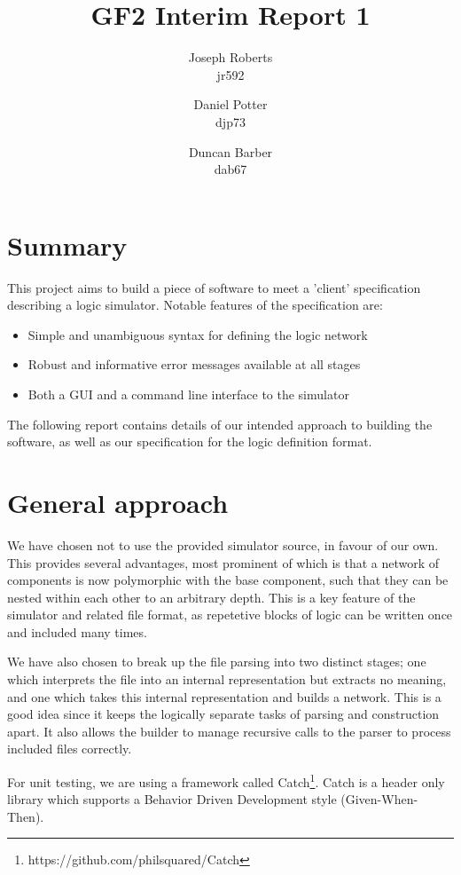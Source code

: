 \documentclass[a4paper]{article}
\author{Joseph Roberts \\
        \small{jr592}
        \and
        Daniel Potter\\
        \small{djp73}
        \and
        Duncan Barber \\
        \small{dab67}
       }
\title{GF2 Interim Report 1}
\begin{document}
\nocite{*}
\maketitle

\section{Summary}
    This project aims to build a piece of software to meet a 'client' specification describing a logic simulator. Notable features of the specification are:
    \begin{itemize}
        \item Simple and unambiguous syntax for defining the logic network
        \item Robust and informative error messages available at all stages
        \item Both a GUI and a command line interface to the simulator
    \end{itemize}

    The following report contains details of our intended approach to building the software, as well as our specification for the logic definition format.

\section{General approach}
\label{sec:general}
    We have chosen not to use the provided simulator source, in favour of our own. This provides several advantages, most prominent of which is that a network of components is now polymorphic with the base component, such that they can be nested within each other to an arbitrary depth. This is a key feature of the simulator and related file format, as repetetive blocks of logic can be written once and included many times.

    We have also chosen to break up the file parsing into two distinct stages; one which interprets the file into an internal representation but extracts no meaning, and one which takes this internal representation and builds a network. This is a good idea since it keeps the logically separate tasks of parsing and construction apart. It also allows the builder to manage recursive calls to the parser to process included files correctly.

    For unit testing, we are using a framework called Catch\footnote{https://github.com/philsquared/Catch}. Catch is a header only library which supports a Behavior Driven Development style (Given-When-Then).
\end{document}
